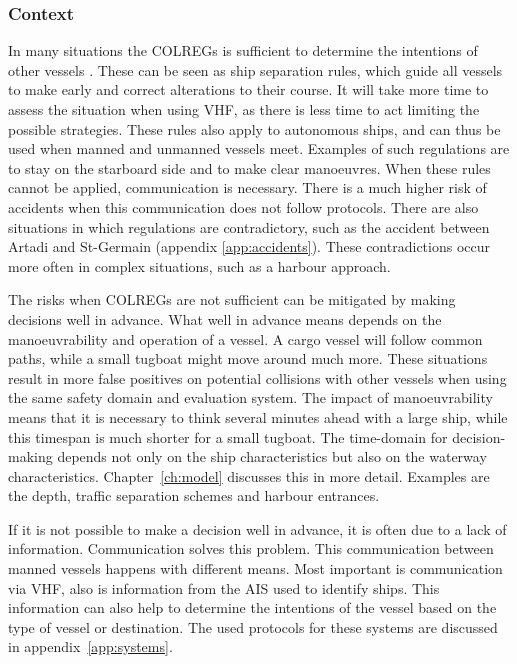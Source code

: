 \subsubsection*{Context}
In many situations the \acf{COLREGs} is sufficient to determine the intentions of other vessels \cite{IMO1972}. These can be seen as ship separation rules, which guide all vessels to make early and correct alterations to their course. It will take more time to assess the situation when using \ac{VHF}, as there is less time to act limiting the possible strategies. These rules also apply to autonomous ships, and can thus be used when manned and unmanned vessels meet.
Examples of such regulations are to stay on the starboard side and to make clear manoeuvres. When these rules cannot be applied, communication is necessary. There is a much higher risk of accidents when this communication does not follow protocols. There are also situations in which regulations are contradictory, such as the accident between Artadi and St-Germain (appendix \ref{app:accidents}). These contradictions occur more often in complex situations, such as a harbour approach.

The risks when \ac{COLREGs} are not sufficient can be mitigated by making decisions well in advance. What well in advance means depends on the manoeuvrability and operation of a vessel. A cargo vessel will follow common paths, while a small tugboat might move around much more. These situations result in more false positives on potential collisions with other vessels when using the same safety domain and evaluation system. The impact of manoeuvrability means that it is necessary to think several minutes ahead with a large ship, while this timespan is much shorter for a small tugboat. The time-domain for decision-making depends not only on the ship characteristics but also on the waterway characteristics. Chapter~\ref{ch:model} discusses this in more detail. Examples are the depth, traffic separation schemes and harbour entrances.

If it is not possible to make a decision well in advance, it is often due to a lack of information. Communication solves this problem. This communication between manned vessels happens with different means. Most important is communication via \ac{VHF}, also is information from the AIS used to identify ships. This information can also help to determine the intentions of the vessel based on the type of vessel or destination. The used protocols for these systems are discussed in appendix~\ref{app:systems}.

